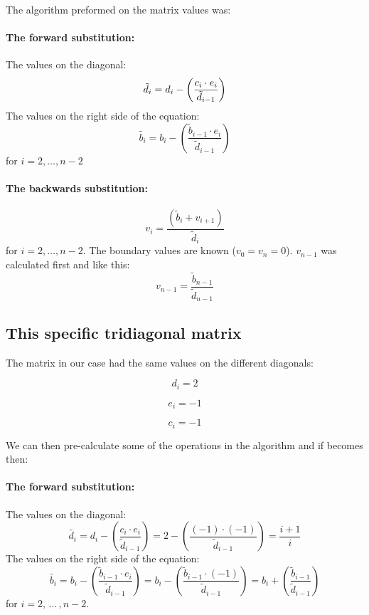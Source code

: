 The algorithm preformed on the matrix values was:

\paragraph{The forward substitution:\hspace{4cm}}

\hspace{1cm}\linebreak
The values on the diagonal:
\[
\tilde{d_i} =  d_i - \left(\frac{c_i \cdot e_i}{\tilde{d}_{i-1}}\right)\linebreak
\]
The values on the right side of the equation:
\[
\tilde{b_i} =  b_i - \left(\frac{\tilde{b}_{i-1} \cdot e_i}{\tilde{d}_{i-1}}\right)
\]
for $i = 2, \dots, n-2 $

\paragraph{The backwards substitution:\hspace{4cm}}

\hspace{1cm}\linebreak
\[
v_i = \frac{\left(\tilde{b}_i + v_{i+1}\right)}{\tilde{d}_i}
\]
for $i = 2, \dots, n-2 $. The boundary values are known ($v_0 = v_n = 0$). $v_{n-1}$ was calculated first and like this:
\[
v_{n-1} = \frac{\tilde{b}_{n-1}}{\tilde{d}_{n-1}}
\]

\subsection{This specific tridiagonal matrix}

The matrix in our case had the same values on the different diagonals:
\begin{multicols}{3}
\[
d_i = 2
\]

\[
e_i = -1
\]

\[
c_i = -1
\]
\end{multicols}

We can then pre-calculate some of the operations in the algorithm and if becomes then:

\paragraph{The forward substitution:\hspace{4cm}}

\hspace{1cm}\linebreak
The values on the diagonal:
\[
\tilde{d_i} =  d_i - \left(\frac{c_i \cdot e_i}{\tilde{d}_{i-1}}\right) = 2 - \left(\frac{(-1) \cdot (-1)}{\tilde{d}_{i-1}}\right) = \frac{i + 1}{i}
\]
The values on the right side of the equation:
\[
\tilde{b_i} =  b_i - \left(\frac{\tilde{b}_{i-1} \cdot e_i}{\tilde{d}_{i-1}}\right) = b_i - \left(\frac{\tilde{b}_{i-1} \cdot (-1)}{\tilde{d}_{i-1}}\right) = b_i + \left(\frac{\tilde{b}_{i-1}}{\tilde{d}_{i-1}}\right)
\]
for $i = 2,\, \dots\, , n-2 $.

